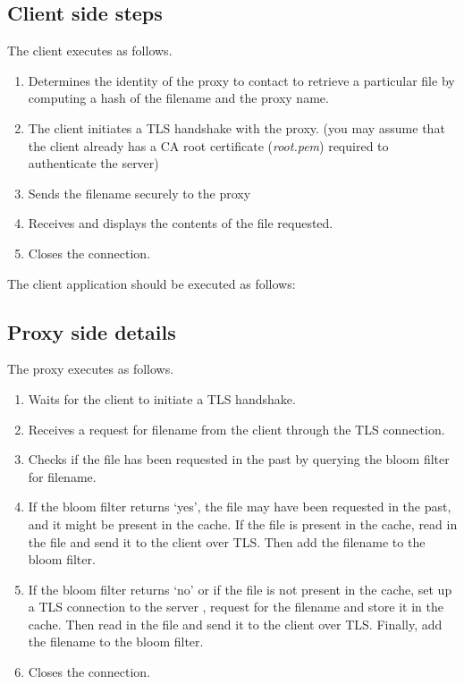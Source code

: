 \documentclass[11pt]{article}
\begin{document}
\subsection{Client side steps}
The client executes as follows.
\begin{enumerate}
\topsep=0pt\itemsep=0pt
\item
Determines the identity of the proxy to contact to retrieve a particular
file by computing a hash of the filename and the proxy name. 
\item
The client initiates a TLS handshake with the proxy.
(you may assume that the client already has a CA root certificate (\textit{root.pem}) required to authenticate the server)
\item
Sends the filename securely to the proxy
\item
Receives and displays the contents of the file requested.
\item
Closes the connection.
\end{enumerate}
\topsep=0pt\itemsep=0pt

The client application should be executed as follows:


\subsection{Proxy side details}
The proxy executes as follows.
\begin{enumerate}
\topsep=0pt\itemsep=0pt
\item
Waits for the client to initiate a TLS handshake.
\item
Receives a request for filename from the client through the TLS connection.
\item 
Checks if the file has been requested in the past by querying the bloom filter for filename.
\item 
If the bloom filter returns `yes', the file may have been requested in the past, and it might be present in the cache. If the file is present in the cache, read in the file and send it to the client over TLS. Then add the filename to the bloom filter.
\item 
If the bloom filter returns `no' or if the file is not present in the cache, set up a TLS connection to the server , request for the filename and store it in the cache. Then read in the file and send it to the client over TLS. Finally, add the filename to the bloom filter.
\item
Closes the connection.
\end{enumerate}
\end{document}
